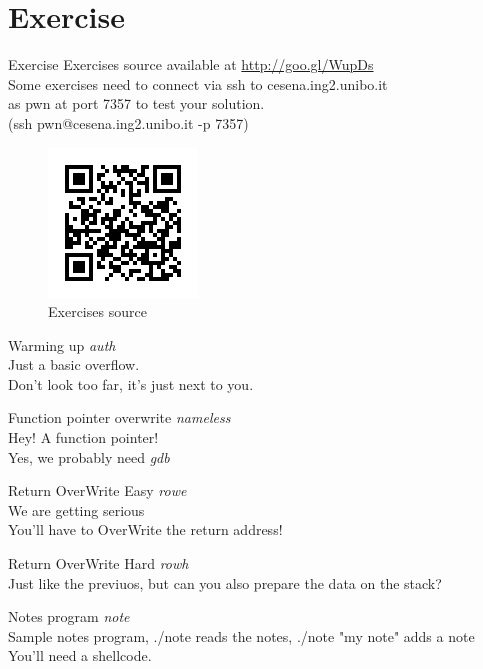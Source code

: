 \section{Exercise}
\begin{frame}{Exercise}
	Exercises source available at \url{http://goo.gl/WupDs}\\
	Some exercises need to connect via ssh to cesena.ing2.unibo.it\\
	 as pwn at port 7357 to test your solution.\\
	(ssh pwn@cesena.ing2.unibo.it -p 7357)\\
	\begin{figure}
		\centering
		\includegraphics[height=.4\textheight]{imgs/qrcode.png}
		\caption{Exercises source}
		\label{fig:qrcode}
	\end{figure}

\framebreak
	\begin{block}{Warming up}
		\emph{auth}\\
		Just a basic overflow.\\
		Don't look too far, it's just next to you.
	\end{block}
\framebreak
	\begin{block}{Function pointer overwrite}
		\emph{nameless}\\
		Hey! A function pointer!\\
		Yes, we probably need \emph{gdb}
	\end{block}
\framebreak
	\begin{block}{Return OverWrite Easy}
		\emph{rowe}\\
		We are getting serious\\
		You'll have to OverWrite the return address!
	\end{block}
\framebreak
	\begin{block}{Return OverWrite Hard}
		\emph{rowh}\\
		Just like the previuos, but can you also prepare the data on the stack?
	\end{block}
\framebreak
	\begin{block}{Notes program}
		\emph{note}\\
		Sample notes program, ./note reads the notes, ./note "my note" adds a note\\
		You'll need a shellcode.
	\end{block}
\end{frame}
